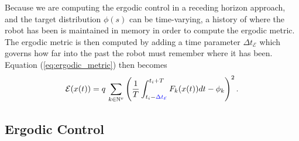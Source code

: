 \documentclass[conference]{IEEEtran}
\begin{document}
Because we are computing the ergodic control in a receding horizon approach, and the target distribution $\phi(s)$ can be time-varying, a history of where the robot has been is maintained in memory in order to compute the ergodic metric.
The ergodic metric is then computed  by adding a time parameter $\Delta t_\mathcal{E}$ which governs how far into the past the robot must remember where it has been. 
Equation (\ref{eq:ergodic_metric}) then becomes
\begin{equation*}
\mathcal{E}(x(t)) = q \, \sum_{k \in \mathbb{N}^v} \left( \frac{1}{T} \int_{t_i-{\color{blue}\Delta t_\mathcal{E}} }^{t_i + T} F_k(x(t)) dt - \phi_k\right) ^2.
\end{equation*}


\subsection{Ergodic Control}
\end{document}

